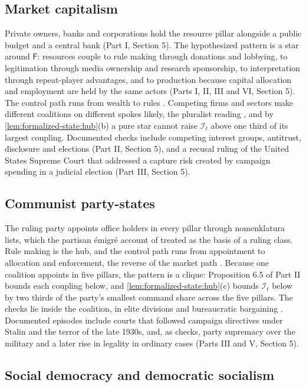 \documentclass[11pt,letterpaper]{article}
\theoremstyle{definition}
\theoremstyle{remark}
\newcommand{\pF}{\mathsf{F}}
\newcommand{\Integ}{\mathcal{I}}
\begin{document}
\subsection{Market capitalism}

Private owners, banks and corporations hold the resource pillar alongside a public budget and a central bank (Part I, Section 5). The hypothesized pattern is a star around $\pF$: resources couple to rule making through donations and lobbying, to legitimation through media ownership and research sponsorship, to interpretation through repeat-player advantages, and to production because capital allocation and employment are held by the same actors (Parts I, II, III and VI, Section 5). The control path runs from wealth to rules \citep{largo2026hbs}. Competing firms and sectors make different coalitions on different spokes likely, the pluralist reading \citep{dahl1961}, and by \cref{lem:formalized-state:hub}(b) a pure star cannot raise $\Integ_t$ above one third of its largest coupling. Documented checks include competing interest groups, antitrust, disclosure and elections (Part II, Section 5), and a recusal ruling of the United States Supreme Court that addressed a capture risk created by campaign spending in a judicial election (Part III, Section 5).

\subsection{Communist party-states}

The ruling party appoints office holders in every pillar through nomenklatura lists, which the partisan \'emigr\'e account of \citet{voslensky1984} treated as the basis of a ruling class. Rule making is the hub, and the control path runs from appointment to allocation and enforcement, the reverse of the market path \citep{largo2026hbs}. Because one coalition appoints in five pillars, the pattern is a clique: Proposition 6.5 of Part II bounds each coupling below, and \cref{lem:formalized-state:hub}(c) bounds $\Integ_t$ below by two thirds of the party's smallest command share across the five pillars. The checks lie inside the coalition, in elite divisions \citep{lane1995} and bureaucratic bargaining \citep{hough1979}. Documented episodes include courts that followed campaign directives under Stalin and the terror of the late 1930s, and, as checks, party supremacy over the military and a later rise in legality in ordinary cases (Parts III and V, Section 5).

\subsection{Social democracy and democratic socialism}
\end{document}
